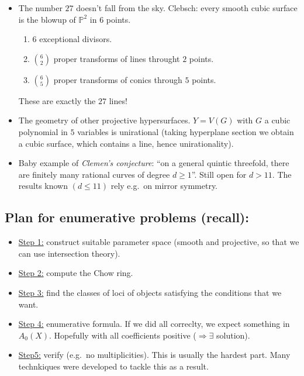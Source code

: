 \documentclass[12pt,a4paper]{amsart}
\theoremstyle{plain}
\theoremstyle{definition}
\theoremstyle{remark}
\begin{document}
\begin{itemize}
  \item The number $27$ doesn't fall from the sky.
    Clebsch: every smooth cubic surface is the blowup of $\mathbb{P}^{2}$ in $6$ points.
    \begin{enumerate}[label=-]
      \item $6$ exceptional divisors.
      \item $\binom{6}{2}$ proper transforms of lines throught $2$ points.
      \item $\binom{6}{5}$ proper transforms of conics through $5$ points.
    \end{enumerate}
    These are exactly the $27$ lines!
  \item The geometry of other projective hypersurfaces.
    $Y = V(G)$ with $G$ a cubic polynomial in $5$ variables is unirational (taking hyperplane section we obtain a cubic surface, which contains a line, hence unirationality).
  \item Baby example of \textit{Clemen's conjecture}: ``on a general quintic threefold, there are finitely many rational curves of degree $d \geq 1$''.
    Still open for $d > 11$.
    The results known $(d \leq 11)$ rely e.g.~on mirror symmetry.
\end{itemize}

\subsection{Plan for enumerative problems (recall):}

\begin{itemize}
  \item \underline{Step 1:} construct suitable parameter space (smooth and projective, so that we can use intersection theory).
  \item \underline{Step 2:} compute the Chow ring.
  \item \underline{Step 3:} find the classes of loci of objects satisfying the conditions that we want.
  \item \underline{Step 4:} enumerative formula.
    If we did all correclty, we expect something in $A_{0}(X)$.
    Hopefully with all coefficients positive ($\Rightarrow \exists$ solution).
  \item \underline{Step5:} verify (e.g.~no multiplicities).
    This is usually the hardest part.
    Many technkiques were developed to tackle this as a result.
\end{itemize}
\end{document}
